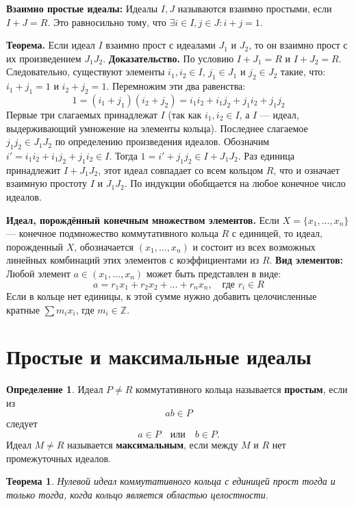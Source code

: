 \documentclass[12pt, a4paper]{article}
\newtheorem{theorem}{Теорема}
\theoremstyle{definition}
\newtheorem{definition}{Определение}
\theoremstyle{remark}
\begin{document}

\textbf{Взаимно простые идеалы:} Идеалы $I, J$ называются взаимно простыми, если $I + J = R$. Это равносильно тому, что $\exists i \in I, j \in J : i + j = 1$.

\textbf{Теорема.} Если идеал $I$ взаимно прост с идеалами $J_1$ и $J_2$, то он взаимно прост с их произведением $J_1 J_2$.
\textbf{Доказательство.} По условию $I + J_1 = R$ и $I + J_2 = R$. Следовательно, существуют элементы $i_1, i_2 \in I$, $j_1 \in J_1$ и $j_2 \in J_2$ такие, что:
$i_1 + j_1 = 1$ и $i_2 + j_2 = 1$.
Перемножим эти два равенства:
$$ 1 = (i_1 + j_1)(i_2 + j_2) = i_1 i_2 + i_1 j_2 + j_1 i_2 + j_1 j_2 $$
Первые три слагаемых принадлежат $I$ (так как $i_1, i_2 \in I$, а $I$ — идеал, выдерживающий умножение на элементы кольца). 
Последнее слагаемое $j_1 j_2 \in J_1 J_2$ по определению произведения идеалов.
Обозначим $i' = i_1 i_2 + i_1 j_2 + j_1 i_2 \in I$. Тогда $1 = i' + j_1 j_2 \in I + J_1 J_2$.
Раз единица принадлежит $I + J_1 J_2$, этот идеал совпадает со всем кольцом $R$, что и означает взаимную простоту $I$ и $J_1 J_2$. По индукции обобщается на любое конечное число идеалов.

\textbf{Идеал, порождённый конечным множеством элементов.} 
Если $X = \{x_1, \dots, x_n\}$ — конечное подмножество коммутативного кольца $R$ с единицей, то идеал, порожденный $X$, обозначается $(x_1, \dots, x_n)$ и состоит из всех возможных линейных комбинаций этих элементов с коэффициентами из $R$.
\textbf{Вид элементов:} Любой элемент $a \in (x_1, \dots, x_n)$ может быть представлен в виде:
$$ a = r_1 x_1 + r_2 x_2 + \dots + r_n x_n, \quad \text{где } r_i \in R $$
Если в кольце нет единицы, к этой сумме нужно добавить целочисленные кратные $\sum m_i x_i$, где $m_i \in \mathbb{Z}$.
\section{Простые и максимальные идеалы}

\begin{definition}
	Идеал $P\neq R$ коммутативного кольца называется \textbf{простым}, если из
	\[
	ab\in P
	\]
	следует
	\[
	a\in P \quad \text{или}\quad b\in P.
	\]
	Идеал $M\neq R$ называется \textbf{максимальным}, если между $M$ и $R$ нет промежуточных идеалов.
\end{definition}

\begin{theorem}
	Нулевой идеал коммутативного кольца с единицей прост тогда и только тогда, когда кольцо является областью целостности.
\end{theorem}
\end{document}
